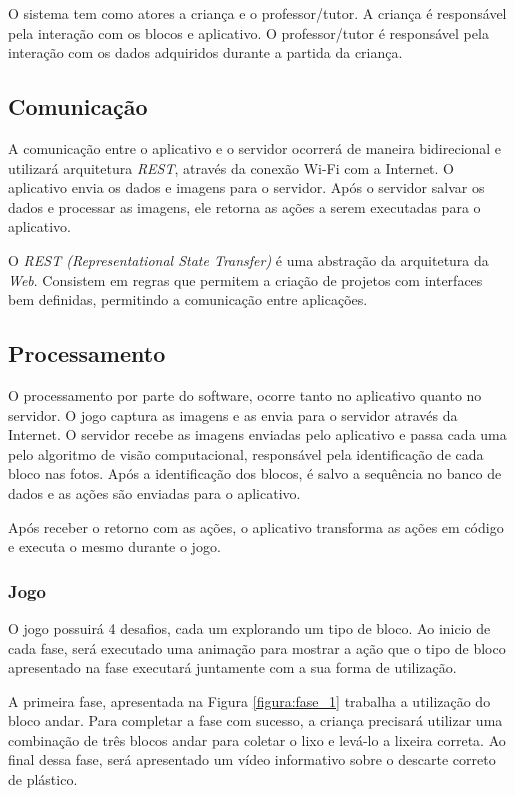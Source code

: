     O sistema tem como atores a criança e o professor/tutor. A criança é responsável pela interação com os blocos e aplicativo.
    O professor/tutor é responsável pela interação com os dados adquiridos durante a partida da criança.
    
    \subsection{Comunicação}
    A comunicação entre o aplicativo e o servidor ocorrerá de maneira bidirecional e utilizará arquitetura \textit{REST}, através da conexão Wi-Fi com a Internet.
    O aplicativo envia os dados e imagens para o servidor. Após o servidor salvar os dados e processar as imagens, ele retorna as ações a serem executadas para o aplicativo.
    
    O \textit{REST (Representational State Transfer)} é uma abstração da arquitetura da \textit{Web}. Consistem em regras que permitem a criação de projetos com interfaces bem definidas, permitindo a comunicação entre aplicações.
    
    \subsection{Processamento}
    
      O processamento por parte do software, ocorre tanto no aplicativo quanto no servidor. O jogo captura as imagens e as envia para o servidor através da Internet. O servidor recebe as imagens enviadas pelo aplicativo e passa cada uma pelo algoritmo de visão computacional, responsável pela identificação de cada bloco nas fotos. Após a identificação dos blocos, é salvo a sequência no banco de dados e as ações são enviadas para o aplicativo.
    
     Após receber o retorno com as ações, o aplicativo transforma as ações em código e executa o mesmo durante o jogo.
     
    \subsubsection{Jogo}
  
    O jogo possuirá 4 desafios, cada um explorando um tipo de bloco. Ao inicio de cada fase, será executado uma animação para mostrar a ação que o tipo de bloco apresentado na fase executará juntamente com a sua forma de utilização.
    
    A primeira fase, apresentada na Figura \ref{figura:fase_1} trabalha a utilização do bloco andar. Para completar a fase com sucesso, a criança precisará utilizar uma combinação de três blocos andar para coletar o lixo e levá-lo a lixeira correta. Ao final dessa fase, será apresentado um vídeo informativo sobre o descarte correto de plástico.
    
